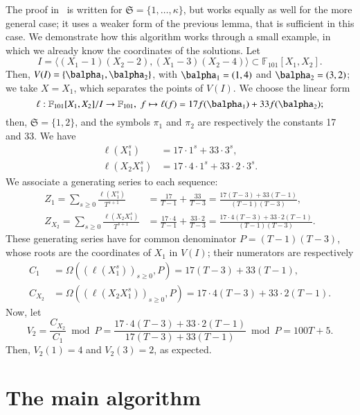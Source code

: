 \documentclass[final,1p,times,authoryear]{elsarticle}
\newcommand{\minpoly}{P}
\newcommand{\lf}{X}
\def\F {\ensuremath{\mathbb{F}}}
\begin{document}
The proof in~\cite{BoSaSc03} is written for
$\mathfrak{S}=\{1,\dots,\kappa\}$, but works equally as well for the
more general case; it uses a weaker form of the previous lemma, that
is sufficient in this case.  We demonstrate how this algorithm works
through a small example, in which we already know the coordinates of
the solutions. Let
$$I = \langle (X_1-1)(X_2-2),(X_1-3)(X_2-4)\rangle \subset
\F_{101}[X_1,X_2].$$ Then, $V(I) = \{\balpha_1,\balpha_2\}$,
with $\balpha_1= (1,4)$ and $\balpha_2=(3,2)$; we take
$\lf=X_1$, which separates the points of $V(I)$.  We choose the linear form
\[
  \ell: \F_{101}[X_1,X_2]/I \to \F_{101},\;
  f \mapsto \ell(f) = 17 f(\balpha_1) + 33 f(\balpha_2);
\]
then, $\mathfrak{S}=\{1,2\}$, and the symbols $\pi_1$ and $\pi_2$ 
are respectively the constants 17 and 33. We have
\begin{align*}
  \ell(X_1^s) &= 17 \cdot 1^s + 33 \cdot 3^s,\\
  \ell(X_2X_1^s) &= 17 \cdot 4 \cdot 1^s + 33 \cdot 2 \cdot 3^s.
\end{align*} 
We associate a generating series to each sequence:
\begin{align*}
  Z_1 = \sum_{s \ge 0} \frac{\ell(X^s_1)}{T^{s+1}}
&= \frac{17}{T-1} + \frac{33}{T-3}
= \frac{17(T-3)+33(T-1)}{(T-1)(T-3)}, \\
Z_{X_2} = \sum_{s\ge0} \frac{\ell(X_2X_1^s)}{T^{s+1} }
&= \frac{17\cdot 4}{T-1} + \frac{33 \cdot 2}{T-3}
= \frac{17\cdot 4 (T-3) + 33\cdot 2(T-1)}{(T-1)(T-3)}.
\end{align*}
These generating series have for common denominator $\minpoly = (T-1)(T-3)$,
whose roots are the coordinates of $X_1$ in $V(I)$;
their numerators are respectively
\begin{align*}
  C_{1} &= \Omega((\ell(X^s_1))_{s\ge 0},\minpoly) = 17 (T-3) + 33(T-1), \\
  C_{X_2} &= \Omega((\ell(X_2X^s_1))_{s\ge 0},\minpoly) = 17\cdot 4 (T-3) + 33\cdot 2(T-1).
\end{align*}
Now, let
\[
  V_2 
  =\frac{C_{X_2}}{C_1} \bmod \minpoly
  =\frac{17\cdot 4 (T-3) + 33\cdot 2(T-1)}{17(T-3)+33(T-1)} \bmod \minpoly
  =100 T +5.
\]
Then, $V_2(1) = 4$ and $V_2(3) = 2$, as expected.


\section{The main algorithm}\label{sec:main}
\end{document}
